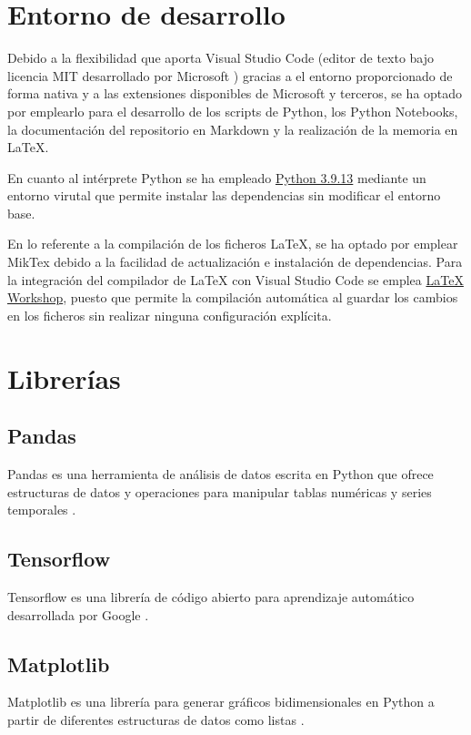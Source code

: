 \section{Entorno de desarrollo}
Debido a la flexibilidad que aporta Visual Studio Code (editor de texto bajo licencia MIT desarrollado por Microsoft \cite{enwiki:vscode2023})
gracias a el entorno proporcionado de forma nativa y a las extensiones disponibles de Microsoft y terceros, se ha optado
por emplearlo para el desarrollo de los scripts de Python, los Python Notebooks, la documentación del repositorio
en Markdown y la realización de la memoria en LaTeX. 

En cuanto al intérprete Python se ha empleado \href{https://www.python.org/downloads/release/python-3913/}{Python 3.9.13} mediante un entorno virutal que permite instalar
las dependencias sin modificar el entorno base.

En lo referente a la compilación de los ficheros LaTeX, se ha optado por emplear 
MikTex debido a la facilidad de actualización e instalación de dependencias.
Para la integración del compilador de LaTeX con Visual Studio Code se emplea 
\href{https://marketplace.visualstudio.com/items?itemName=James-Yu.latex-workshop}{LaTeX Workshop}, 
puesto que permite la compilación automática al guardar los cambios en los ficheros sin realizar
ninguna configuración explícita.

\section{Librerías}
\subsection{Pandas}
Pandas es una herramienta de análisis de datos escrita en Python que ofrece estructuras 
de datos y operaciones para manipular tablas numéricas y series temporales 
\cite{eswiki:pandas2023}.

\subsection{Tensorflow}
Tensorflow es una librería de código abierto para aprendizaje automático desarrollada
por Google \cite{eswiki:tensorflow2021}.

\subsection{Matplotlib}
Matplotlib es una librería para generar gráficos bidimensionales en Python a partir de 
diferentes estructuras de datos como listas \cite{eswiki:matplotlib2022}.


